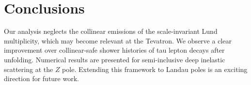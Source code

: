 \section{Conclusions}\label{sec:conclusions}

Our analysis neglects the collinear emissions of the scale-invariant
Lund multiplicity, which may become relevant at the Tevatron. We observe
a clear improvement over collinear-safe shower histories of tau lepton
decays after unfolding. Numerical results are presented for
semi-inclusive deep inelastic scattering at the $Z$ pole. Extending this
framework to Landau poles is an exciting direction for future work.

